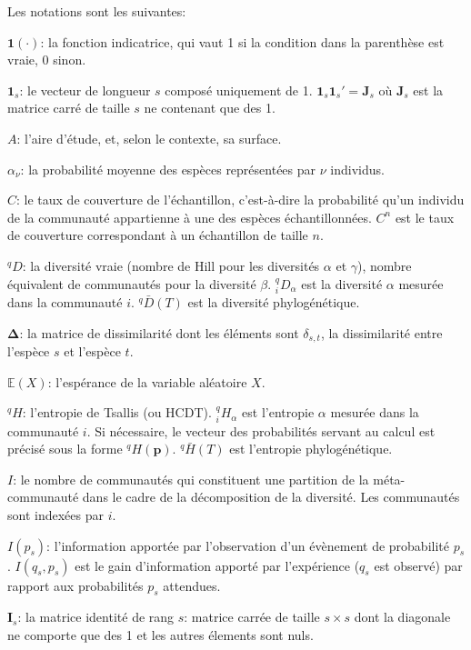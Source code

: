 \documentclass[
  11pt,
  french,
  a4paper,
  extrafontsizes,onecolumn,openright
  ]{memoir}
\newlength{\rf}
\begin{document}
Les notations sont les suivantes:

\noindent \({\mathbf 1}(\cdot)\): la fonction indicatrice, qui vaut 1 si la condition dans la parenthèse est vraie, 0 sinon.

\noindent \(\mathbf{1}_s\): le vecteur de longueur \(s\) composé uniquement de 1. \(\mathbf{1}_s\mathbf{1}_s'=\mathbf{J}_s\) où \(\mathbf{J}_s\) est la matrice carré de taille \(s\) ne contenant que des 1.

\noindent \(A\): l'aire d'étude, et, selon le contexte, sa surface.

\noindent \(\alpha_\nu\): la probabilité moyenne des espèces représentées par \(\nu\) individus.

\noindent \(C\): le taux de couverture de l'échantillon, c'est-à-dire la probabilité qu'un individu de la communauté appartienne à une des espèces échantillonnées.
\(C^{n}\) est le taux de couverture correspondant à un échantillon de taille \(n\).

\noindent \(^{q}\!D\): la diversité vraie (nombre de Hill pour les diversités \(\alpha\) et \(\gamma\)), nombre équivalent de communautés pour la diversité \(\beta\).
\(^{q}_{i}\!D_{\alpha}\) est la diversité \(\alpha\) mesurée dans la communauté \(i\).
\(^{q}\!\bar{D}\left(T\right)\) est la diversité phylogénétique.

\noindent \(\boldsymbol{\Delta}\): la matrice de dissimilarité dont les éléments sont \(\delta_{s,t}\), la dissimilarité entre l'espèce \(s\) et l'espèce \(t\).

\noindent \({\mathbb E}\left(X\right)\): l'espérance de la variable aléatoire \(X\).

\noindent \(^{q}\!H\): l'entropie de Tsallis (ou HCDT).
\(^{q}_{i}\!H_{\alpha}\) est l'entropie \(\alpha\) mesurée dans la communauté \(i\).
Si nécessaire, le vecteur des probabilités servant au calcul est précisé sous la forme \(^{q}\!H(\mathbf{p})\).
\(^{q}\!\bar{H}(T)\) est l'entropie phylogénétique.

\noindent \(I\): le nombre de communautés qui constituent une partition de la méta-communauté dans le cadre de la décomposition de la diversité.
Les communautés sont indexées par \(i\).

\noindent \(I(p_s)\): l'information apportée par l'observation d'un évènement de probabilité \(p_s\).
\(I(q_s,p_s)\) est le gain d'information apporté par l'expérience (\(q_s\) est observé) par rapport aux probabilités \(p_s\) attendues.

\noindent \(\mathbf{I}_s\): la matrice identité de rang \(s\): matrice carrée de taille \(s\times s\) dont la diagonale ne comporte que des 1 et les autres élements sont nuls.
\end{document}
